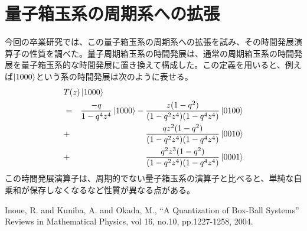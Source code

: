 \documentclass[twocolumn,10pt]{jarticle}
\begin{document}
\section{量子箱玉系の周期系への拡張}
今回の卒業研究では、この量子箱玉系の周期系への拡張を試み、その時間発展演算子の性質を調べた。量子周期箱玉系の時間発展は、通常の周期箱玉系の時間発展を量子箱玉系的な時間発展に置き換えて構成した。この定義を用いると、例えば$\ket{1000}$という系の時間発展は次のように表せる。
\begin{eqnarray*}
\lefteqn{ T(z)\ket{1000} }  \\
& = &\frac{-q}{1 - q^{4} z^{4}}\ket{1000} - \frac{z (1 - q^{2})}{(1-q^{2} z^{4})(1 - q^{4} z^{4})}\ket{0100} \\
& + & \frac{qz^2 (1 - q^{2})}{(1-q^{2} z^{4})(1 - q^{4} z^{4})}\ket{0010} \\
& + & \frac{q^2z^3 (1 - q^{2})}{(1-q^{2} z^{4})(1 - q^{4} z^{4})}\ket{0001} \\
\end{eqnarray*}
この時間発展演算子は、周期的でない量子箱玉系の演算子と比べると、単純な自乗和が保存しなくなるなど性質が異なる点がある。

\begin{thebibliography}{1}
  \bibitem{} Inoue, R. and Kuniba, A. and Okada, M.,
    ``A Quantization of Box-Ball Systems'' Reviews in Mathematical Physics,
    vol 16, no.10, pp.1227-1258, 2004.
\end{thebibliography}
\end{document}
